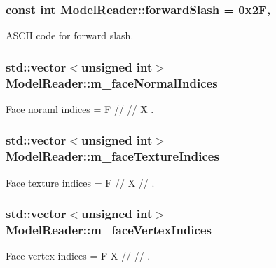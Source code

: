 \subsubsection[{\texorpdfstring{forward\+Slash}{forwardSlash}}]{\setlength{\rightskip}{0pt plus 5cm}const int Model\+Reader\+::forward\+Slash = 0x2F\hspace{0.3cm}{\ttfamily [static]}, {\ttfamily [private]}}\hypertarget{class_model_reader_a869fdfcdef0938fd7c06a0c35ee53488}{}\label{class_model_reader_a869fdfcdef0938fd7c06a0c35ee53488}
A\+S\+C\+II code for forward slash. 
\subsubsection[{\texorpdfstring{m\+\_\+face\+Normal\+Indices}{m_faceNormalIndices}}]{\setlength{\rightskip}{0pt plus 5cm}std\+::vector$<$unsigned int$>$ Model\+Reader\+::m\+\_\+face\+Normal\+Indices\hspace{0.3cm}{\ttfamily [private]}}\hypertarget{class_model_reader_a8063140b52f022f32ff26e5ef504f1e4}{}\label{class_model_reader_a8063140b52f022f32ff26e5ef504f1e4}
Face noraml indices = F // // X . 
\subsubsection[{\texorpdfstring{m\+\_\+face\+Texture\+Indices}{m_faceTextureIndices}}]{\setlength{\rightskip}{0pt plus 5cm}std\+::vector$<$unsigned int$>$ Model\+Reader\+::m\+\_\+face\+Texture\+Indices\hspace{0.3cm}{\ttfamily [private]}}\hypertarget{class_model_reader_ae39f1d039babc141dd5762cce97849e7}{}\label{class_model_reader_ae39f1d039babc141dd5762cce97849e7}
Face texture indices = F // X // . 
\subsubsection[{\texorpdfstring{m\+\_\+face\+Vertex\+Indices}{m_faceVertexIndices}}]{\setlength{\rightskip}{0pt plus 5cm}std\+::vector$<$unsigned int$>$ Model\+Reader\+::m\+\_\+face\+Vertex\+Indices\hspace{0.3cm}{\ttfamily [private]}}\hypertarget{class_model_reader_a9c06d6c9bbadaebcb4c9e252c1ee91f9}{}\label{class_model_reader_a9c06d6c9bbadaebcb4c9e252c1ee91f9}
Face vertex indices = F X // // . 
